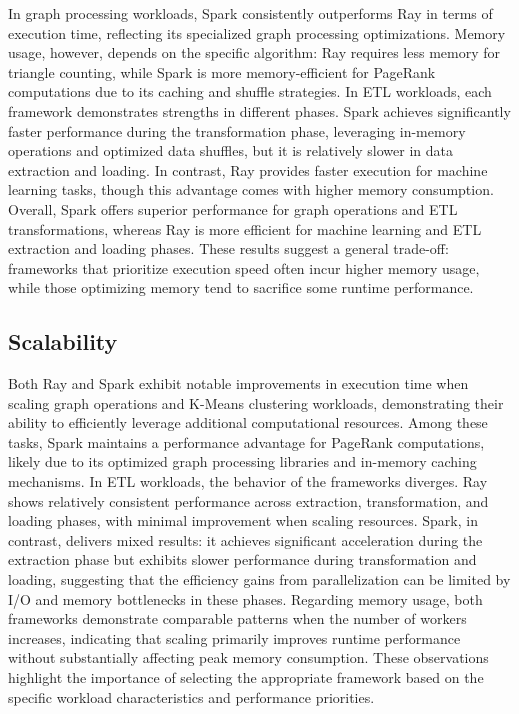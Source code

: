 \documentclass[conference]{IEEEtran}
\begin{document}
In graph processing workloads, Spark consistently outperforms Ray in
terms of execution time, reflecting its specialized graph processing
optimizations. Memory usage, however, depends on the specific
algorithm: Ray requires less memory for triangle counting, while
Spark is more memory-efficient for PageRank computations due to its
caching and shuffle strategies. In ETL workloads, each framework
demonstrates strengths in different phases. Spark achieves
significantly faster performance during the transformation phase,
leveraging in-memory operations and optimized data shuffles, but it
is relatively slower in data extraction and loading. In contrast,
Ray provides faster execution for machine learning tasks, though this
advantage comes with higher memory consumption. Overall, Spark offers
superior performance for graph operations and ETL transformations,
whereas Ray is more efficient for machine learning and ETL extraction
and loading phases. These results suggest a general trade-off:
frameworks that prioritize execution speed often incur higher memory
usage, while those optimizing memory tend to sacrifice some runtime
performance.


\subsection{Scalability}

Both Ray and Spark exhibit notable improvements in execution time
when scaling graph operations and K-Means clustering workloads,
demonstrating their ability to efficiently leverage additional
computational resources. Among these tasks, Spark maintains a
performance advantage for PageRank computations, likely due to
its optimized graph processing libraries and in-memory caching
mechanisms. In ETL workloads, the behavior of the frameworks
diverges. Ray shows relatively consistent performance across
extraction, transformation, and loading phases, with minimal
improvement when scaling resources. Spark, in contrast, delivers
mixed results: it achieves significant acceleration during the
extraction phase but exhibits slower performance during
transformation and loading, suggesting that the efficiency gains
from parallelization can be limited by I/O and memory bottlenecks
in these phases. Regarding memory usage, both frameworks demonstrate
comparable patterns when the number of workers increases, indicating
that scaling primarily improves runtime performance without
substantially affecting peak memory consumption. These observations
highlight the importance of selecting the appropriate framework
based on the specific workload characteristics and performance
priorities.
\end{document}
